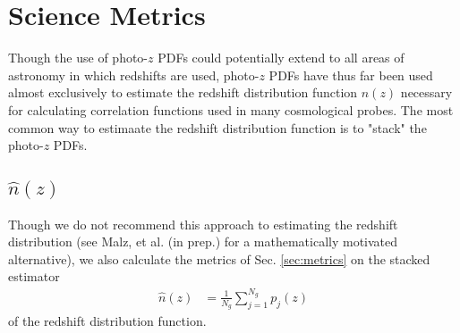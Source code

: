 \documentclass[\docopts]{\docclass}
\begin{document}


\section{Science Metrics}
\label{sec:science}

Though the use of photo-$z$ PDFs could potentially extend to all areas of astronomy in which redshifts are used, photo-$z$ PDFs have thus far been used almost exclusively to estimate the redshift distribution function $n(z)$ necessary for calculating correlation functions used in many cosmological probes.  The most common way to estimaate the redshift distribution function is to "stack" the photo-$z$ PDFs.

\subsection{$\hat{n}(z)$}
\label{sec:nz}

Though we do not recommend this approach to estimating the redshift distribution (see Malz, et al. (in prep.) for a mathematically motivated alternative), we also calculate the metrics of Sec. \ref{sec:metrics} on the stacked estimator
\begin{align}
  \label{eq:nz}
  \hat{n}(z) &= \frac{1}{N_{g}}\sum_{j=1}^{N_{g}}
 p_{j}(z)
\end{align}
of the redshift distribution function.





\end{document}

